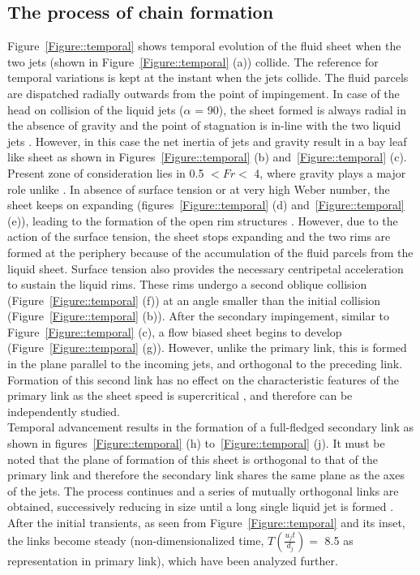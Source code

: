 \subsection{The process of chain formation}
Figure~\ref{Figure::temporal} shows temporal evolution of the fluid sheet when the two jets (shown in Figure~\ref{Figure::temporal} (a)) collide. The reference for temporal variations is kept at the instant when the jets collide. The fluid parcels are dispatched radially outwards from the point of impingement. In case of the head on collision of the liquid jets ($\alpha$ = 90\degree), the sheet formed is always radial in the absence of gravity \citep{eggers2008physics} and the point of stagnation is in-line with the two liquid jets \citep{inamura2014effect}. However, in this case the net inertia of jets and gravity result in a bay leaf like sheet as shown in Figures~\ref{Figure::temporal} (b) and~\ref{Figure::temporal} (c). Present zone of consideration lies in 0.5 $< Fr <$ 4, where gravity plays a major role unlike \citet{bush2004collision,bremond2006atomization}. In absence of surface tension or at very high Weber number, the sheet keeps on expanding (figures~\ref{Figure::temporal} (d) and~\ref{Figure::temporal} (e)), leading to the formation of the open rim structures \citep{taylor1960formation,chen2013high}. However, due to the action of the surface tension, the sheet stops expanding and the two rims are formed at the periphery because of the accumulation of the fluid parcels from the liquid sheet. Surface tension also provides the necessary centripetal acceleration to sustain the liquid rims. These rims undergo a second oblique collision (Figure~\ref{Figure::temporal} (f)) at an angle smaller than the initial collision (Figure~\ref{Figure::temporal} (b)). After the secondary impingement, similar to Figure~\ref{Figure::temporal} (c), a flow biased sheet begins to develop (Figure~\ref{Figure::temporal} (g)). However, unlike the primary link, this is formed in the plane parallel to the incoming jets, and orthogonal to the preceding link.  Formation of this second link has no effect on the characteristic features of the primary link as the sheet speed is supercritical \citep{bush2004collision}, and therefore can be independently studied.\\
Temporal advancement results in the formation of a full-fledged secondary link as shown in figures~\ref{Figure::temporal} (h) to~\ref{Figure::temporal} (j). It must be noted that the plane of formation of this sheet is orthogonal to that of the primary link and therefore the secondary link shares the same plane as the axes of the jets. The process continues and a series of mutually orthogonal links are obtained, successively reducing in size until a long single liquid jet is formed \citep{bush2004collision}. After the initial transients, as seen from Figure~\ref{Figure::temporal} and its inset, the links become steady (non-dimensionalized time, $T \left(\frac{u_jt}{d_j}\right) = $ 8.5 as representation in primary link), which have been analyzed further.
